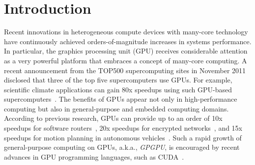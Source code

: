 \section{Introduction}
\label{sec:introduction}

Recent innovations in heterogeneous compute devices with many-core
technology have continuously achieved orders-of-magnitude increases in
systems performance. 
In particular, the graphics processing unit (GPU) receives considerable
attention as a very powerful platform that embraces a concept of
many-core computing.
A recent announcement from the TOP500 supercomputing sites in November
2011~\cite{TOP500} disclosed that three of the top five supercomputers
use GPUs.
For example, scientific climate applications can gain 80x speedups using
such GPU-based supercomputers~\cite{Shimokawabe10}.
The benefits of GPUs appear not only in high-performance computing but
also in general-purpose and embedded computing domains.
According to previous research, GPUs can provide up to an order of 10x
speedups for software routers~\cite{Han_SIGCOMM10}, 20x speedups for
encrypted networks~\cite{Jang_NSDI11}, and 15x speedups for motion
planning in autonomous vehicles~\cite{McNaughton_ICRA11}.
Such a rapid growth of general-purpose computing on GPUs,
a.k.a., \textit{GPGPU}, is encouraged by recent advances in GPU
programming languages, such as CUDA~\cite{CUDA40}.

